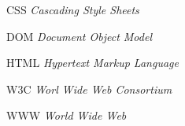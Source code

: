 %
%

\begin{siglas}
    \item[CSS] \textit{Cascading Style Sheets}
    \item[DOM] \textit{Document Object Model}    
    \item[HTML] \textit{Hypertext Markup Language}
    \item[W3C] \textit{Worl Wide Web Consortium}
    \item[WWW] \textit{World Wide Web}
\end{siglas}
